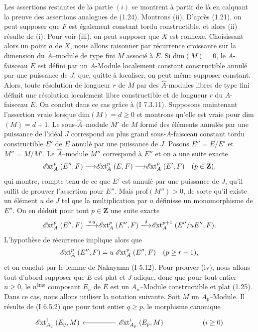 Les assertions restantes de la partie $(i)$ se montrent à partir de là en calquant la preuve des assertions analogues de (1.24). Montrons (ii). D'après (1.21), on peut supposer que $F$ est également constant tordu constructible, et alors (ii) résulte de (i). Pour voir (iii), on peut supposer que $X$ est connexe. Choisissant alors un point $a$ de $X$, nous allons raisonner par récurrence croissante sur la dimension du $\hat{A}$--module de type fini $M$ associé à $E$. Si dim$(M) = 0$, le $A$-faisceau $E$ est défini par un $A$-Module localement constant constructible annulé par une puissance de $J$, que, quitte à localiser, on peut même supposer constant. Alors, toute résolution de longueur $r$ de $M$ par des $\hat{A}$-modules libres de type fini définit une résolution localement libre constructible et de longueur $r$ du $A$-faisceau $E$. On conclut dans ce cas grâce à (I 7.3.11). Supposons maintenant l'assertion vraie lorsque dim$(M) = d \geq 0$ et montrons qu'elle est vraie pour dim$(M) = d+1$. Le sous-$\hat{A}$--module $M'$ de $M$ formé des éléments annulés par une puissance de l'idéal $J$ correspond au plus grand sous-$A$-faisceau constant tordu constructible $E'$ de $E$ annulé par une puissance de $J$. Posons $E'' = E/E'$ et $M'' = M/M'$. Le $\hat{A}$--module $M''$ correspond à $E''$ et on a une suite exacte
$$
\mathrel{\mathscr{E}\mkern-2mu\text{\upshape xt}}^p_A(E'', F) \longrightarrow \mathrel{\mathscr{E}\mkern-2mu\text{\upshape xt}}^p_A(E, F) \longrightarrow \mathrel{\mathscr{E}\mkern-2mu\text{\upshape xt}}^p_A(E', F) \quad (p \in \mathbf{Z}),
$$
qui montre, compte tenu de ce que $E'$ est annulé par une puissance de $J$, qu'il suffit de prouver l'assertion pour $E''$. Mais prof$(M'') > 0$, de sorte qu'il existe un élément $u$ de $J$ tel que la multiplication par $u$ définisse un monomorphisme de $E''$. On en déduit pour tout $p \in \mathbf{Z}$ une suite exacte
$$
\cExt^p_A(E'', F) \xlongrightarrow{\times u} \cExt^p_A(E'', F) \xlongrightarrow{\delta} \cExt^{p+1}_A(E''/uE'', F).
$$
L'hypothèse de récurrence implique alors que 
$$
\mathrel{\mathscr{E}\mkern-2mu\text{\upshape xt}}^p_A(E'', F) = u \mathrel{\mathscr{E}\mkern-2mu\text{\upshape xt}}^p_A(E'', F) \quad (p \geq r+1),
$$
et on conclut par le lemme de Nakayama (I 5.12). Pour prouver (iv), nous allons tout d'abord supposer que $E$ est plat et $J$-adique, donc que pour tout entier $n \geq 0$, le $n^{\text{ème}}$ composant $E_n$ de $E$ est un $A_n$--Module constructible et plat (1.25). Dans ce cas, nous allons utiliser la notation suivante. Soit $M$ un $A_p$--Module. Il résulte de (I 6.5.2) que pour tout entier $q \geq p$, le morphisme canonique
\[\begin{tikzcd}
	{\cExt^i_{A_q}(E_q, M)} && {\cExt^i_{A_p}(E_p, M)} && {(i \geq 0)}
	\arrow[from=1-3, to=1-1]
\end{tikzcd}\]
